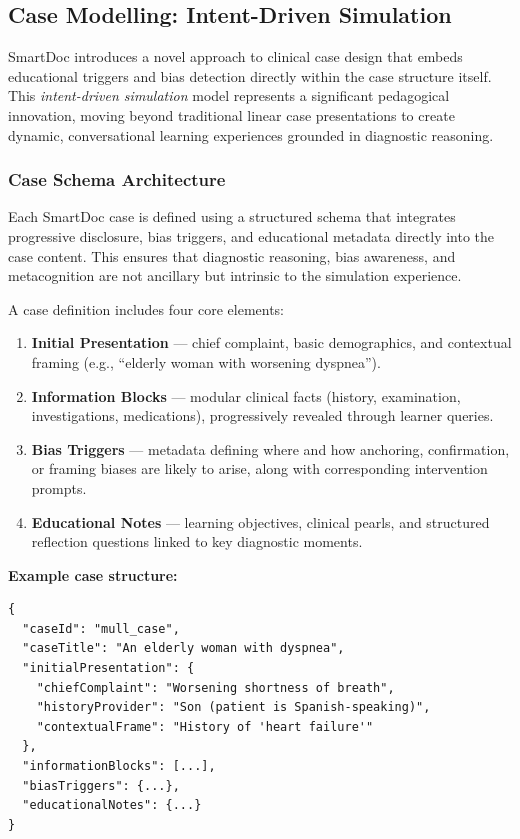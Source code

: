 \subsection{Case Modelling: Intent-Driven Simulation}
\label{sec:case_design_intent_driven}

SmartDoc introduces a novel approach to clinical case design that embeds educational
triggers and bias detection directly within the case structure itself.
This \textit{intent-driven simulation} model represents a significant pedagogical
innovation, moving beyond traditional linear case presentations to create dynamic,
conversational learning experiences grounded in diagnostic reasoning.

\subsubsection{Case Schema Architecture}

Each SmartDoc case is defined using a structured schema that integrates progressive
disclosure, bias triggers, and educational metadata directly into the case content.
This ensures that diagnostic reasoning, bias awareness, and metacognition are not
ancillary but intrinsic to the simulation experience.

A case definition includes four core elements:

\begin{enumerate}
  \item \textbf{Initial Presentation} — chief complaint, basic demographics, and
  contextual framing (e.g., ``elderly woman with worsening dyspnea'').
  \item \textbf{Information Blocks} — modular clinical facts (history, examination,
  investigations, medications), progressively revealed through learner queries.
  \item \textbf{Bias Triggers} — metadata defining where and how anchoring,
  confirmation, or framing biases are likely to arise, along with corresponding
  intervention prompts.
  \item \textbf{Educational Notes} — learning objectives, clinical pearls, and
  structured reflection questions linked to key diagnostic moments.
\end{enumerate}

\noindent
\textbf{Example case structure:}

\begin{verbatim}
{
  "caseId": "mull_case",
  "caseTitle": "An elderly woman with dyspnea",
  "initialPresentation": {
    "chiefComplaint": "Worsening shortness of breath",
    "historyProvider": "Son (patient is Spanish-speaking)",
    "contextualFrame": "History of 'heart failure'"
  },
  "informationBlocks": [...],
  "biasTriggers": {...},
  "educationalNotes": {...}
}
\end{verbatim}

